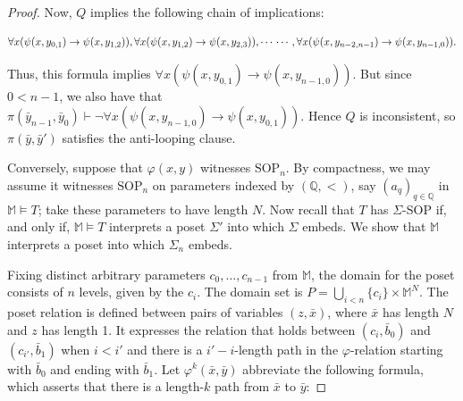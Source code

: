 \documentclass{article}
\newcommand{\bbM}{\mathbb{M}}
\newcommand{\bbQ}{\mathbb{Q}}
\newcommand{\tp}{\text{tp}}
\newcommand{\SOP}{\text{SOP}}
\newcommand{\vphi}{\varphi}
\theoremstyle{definition}
\theoremstyle{definition}
\theoremstyle{definition}
\begin{document}
\begin{proof}
    Now, $Q$ implies the following chain of implications:

   $$
    \forall x(\psi(x, y_{0,1})\to \psi(x, y_{1,2})), \forall x(\psi(x, y_{1,2})\to \psi(x, y_{2,3})), \dotsm\\
    \dotsm, \forall x(\psi(x, y_{n-2,n-1})\to \psi(x, y_{n-1,0})).
  $$


    Thus, this formula implies $\forall x(\psi(x, y_{0,1})\to \psi(x, y_{n-1,0}))$. But since $0 < n-1$, we also have that $\pi(\bar{y}_{n-1},\bar{y}_0) \vdash\neg \forall x(\psi(x, y_{n-1,0})\to \psi(x, y_{0, 1}))$. Hence $Q$ is inconsistent, so $\pi(\bar{y}, \bar{y}')$ satisfies the anti-looping clause.
    




    Conversely, suppose that $\vphi(x,y)$ witnesses $\SOP_n$. By compactness, we may assume it witnesses $\SOP_n$ on parameters indexed by $(\bbQ,<)$, say $(a_q)_{q\in\bbQ}$ in $\bbM\models T$; take these parameters to have length $N$. %
Now recall that $T$ has $\Sigma$-SOP if, and only if, $\bbM\models T$ interprets a poset $\Sigma'$ into which $\Sigma$ embeds. We show that $\bbM$ interprets a poset into which $\Sigma_n$ embeds. 

Fixing distinct arbitrary parameters $c_0,\dots, c_{n-1}$ from $\bbM$, the domain for the poset consists of $n$ levels, given by the $c_i$. The domain set is $P=\bigcup_{i<n}\{c_i\}\times\bbM^N$. The poset relation is defined between pairs of variables $(z,\bar{x})$, where $\bar{x}$ has length $N$ and $z$ has length 1. It expresses the relation that holds between $(c_i, \bar{b}_0)$ and $(c_{i'},\bar{b}_1)$ when $i<i'$ and there is a $i'-i$-length path in the $\vphi$-relation starting with $\bar{b}_0$ and ending with $\bar{b}_1$. Let $\vphi^k(\bar{x}, \bar{y})$ abbreviate the following formula, which asserts that there is a length-$k$ path from $\bar{x}$ to $\bar{y}$:


\end{proof}
\end{document}
